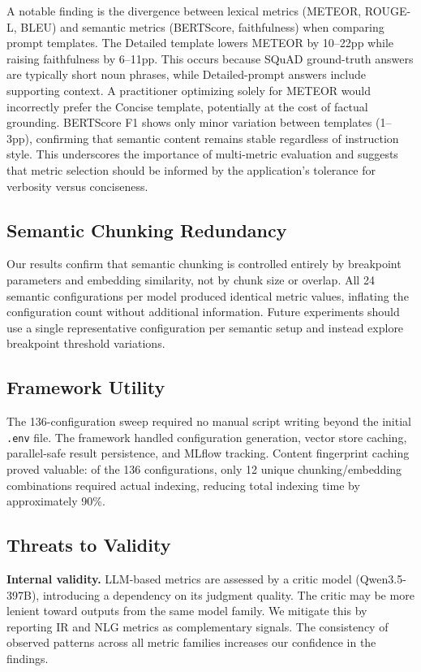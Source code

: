 A notable finding is the divergence between lexical metrics (METEOR, ROUGE-L, BLEU) and semantic metrics (BERTScore, faithfulness) when comparing prompt templates. The Detailed template lowers METEOR by 10--22pp while raising faithfulness by 6--11pp. This occurs because SQuAD ground-truth answers are typically short noun phrases, while Detailed-prompt answers include supporting context. A practitioner optimizing solely for METEOR would incorrectly prefer the Concise template, potentially at the cost of factual grounding. BERTScore F1 shows only minor variation between templates (1--3pp), confirming that semantic content remains stable regardless of instruction style. This underscores the importance of multi-metric evaluation and suggests that metric selection should be informed by the application's tolerance for verbosity versus conciseness.

\subsection{Semantic Chunking Redundancy}

Our results confirm that semantic chunking is controlled entirely by breakpoint parameters and embedding similarity, not by chunk size or overlap. All 24 semantic configurations per model produced identical metric values, inflating the configuration count without additional information. Future experiments should use a single representative configuration per semantic setup and instead explore breakpoint threshold variations.

\subsection{Framework Utility}

The 136-configuration sweep required no manual script writing beyond the initial \texttt{.env} file. The framework handled configuration generation, vector store caching, parallel-safe result persistence, and MLflow tracking. Content fingerprint caching proved valuable: of the 136 configurations, only 12 unique chunking/embedding combinations required actual indexing, reducing total indexing time by approximately 90\%.

\subsection{Threats to Validity}

\textbf{Internal validity.} LLM-based metrics are assessed by a critic model (Qwen3.5-397B), introducing a dependency on its judgment quality. The critic may be more lenient toward outputs from the same model family. We mitigate this by reporting IR and NLG metrics as complementary signals. The consistency of observed patterns across all metric families increases our confidence in the findings.

